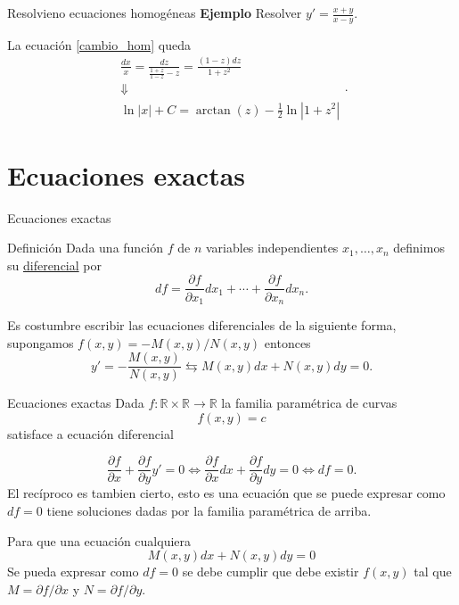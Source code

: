 \documentclass[handout,hyperref={colorlinks=true}]{beamer}
\newcommand{\rr}{\mathbb{R}}
\newcommand{\nl}{\onslide<+-> }
\begin{document}
\begin{frame}{Resolvieno ecuaciones homogéneas}
\textbf{Ejemplo} Resolver $y'=\frac{x+y}{x-y}$. 

La ecuación \eqref{cambio_hom} queda
\[ \begin{array}{c} \frac{dx}{x}=\frac{dz}{\frac{1+z}{1-z}-z}=\frac{(1-z)dz}{1+z^2}\\
 \Downarrow\\
\ln|x|+C=\arctan(z)-\frac{1}{2}\ln|1+z^2|
    \end{array}.
\]



\end{frame}

\section[Exactas]{Ecuaciones exactas}

\begin{frame}{Ecuaciones exactas}

\begin{block}{Definición}
\nl Dada una función $f$ de $n$ variables independientes $x_1,\ldots,x_n$ definimos su \href{http://es.wikipedia.org/wiki/Diferencial_de_una_función}{diferencial}
 por 
 \[df=\frac{\partial f}{\partial x_1}dx_1+\cdots +\frac{\partial f}{\partial x_n}dx_n.\]
\end{block}

\nl Es costumbre escribir las ecuaciones diferenciales   de la siguiente forma, supongamos  $f(x,y)=-M(x,y)/N(x,y)$
entonces
\[y'=-\frac{M(x,y)}{N(x,y)}\leftrightarrows M(x,y)dx+N(x,y)dy=0.\] 


\end{frame}

\begin{frame}{Ecuaciones exactas}
\nl Dada $f:\rr\times\rr\to\rr$ la familia paramétrica de curvas
\[f(x,y)=c\]
satisface a ecuación diferencial

\[
 \frac{\partial f}{\partial x}+\frac{\partial f}{\partial y}y'=0\Longleftrightarrow \frac{\partial f}{\partial x}dx+\frac{\partial f}{\partial y}dy=0
 \Longleftrightarrow df=0.
\]
\nl El recíproco es tambien cierto, esto es una ecuación que se puede expresar como $df=0$  tiene soluciones dadas por la familia paramétrica de arriba. 

\nl Para que una ecuación cualquiera
\[M(x,y)dx+N(x,y)dy=0\]
Se pueda expresar como $df=0$ se debe cumplir que debe existir $f(x,y)$ tal que $M=\partial f/\partial x$ y $N=\partial f/\partial y$.
\end{frame}
\end{document}
